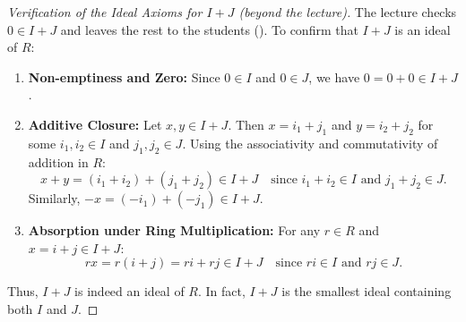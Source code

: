 \begin{content}

\begin{proof}[Verification of the Ideal Axioms for $I + J$ (beyond the lecture)]
The lecture checks $0 \in I + J$ and leaves the rest to the students (). To confirm that $I + J$ is an ideal of $R$:
\begin{enumerate}[label=\textbf{(\arabic*)}]
    \setcounter{enumi}{0} \item \textbf{Non-emptiness and Zero:} Since $0 \in I$ and $0 \in J$, we have $0 = 0 + 0 \in I + J$.
    \setcounter{enumi}{1} \item \textbf{Additive Closure:} Let $x, y \in I + J$. Then $x = i_1 + j_1$ and $y = i_2 + j_2$ for some $i_1, i_2 \in I$ and $j_1, j_2 \in J$. Using the associativity and commutativity of addition in $R$:
    \[
    x + y = (i_1 + i_2) + (j_1 + j_2) \in I + J \quad \text{since } i_1 + i_2 \in I \text{ and } j_1 + j_2 \in J.
    \]
    Similarly, $-x = (-i_1) + (-j_1) \in I + J$.
    \setcounter{enumi}{2} \item \textbf{Absorption under Ring Multiplication:} For any $r \in R$ and $x = i + j \in I + J$:
    \[
    r x = r (i + j) = r i + r j \in I + J \quad \text{since } r i \in I \text{ and } r j \in J.
    \]
\end{enumerate}
Thus, $I + J$ is indeed an ideal of $R$. In fact, $I + J$ is the smallest ideal containing both $I$ and $J$.
\end{proof}
\end{content}

